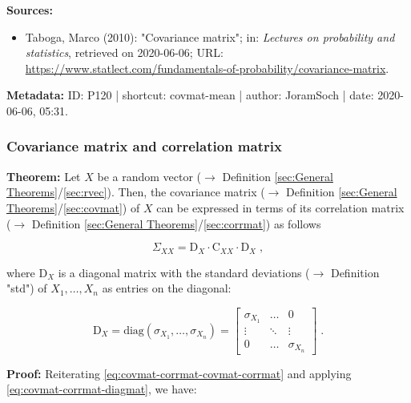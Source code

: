 \documentclass[a4paper,12pt,twoside]{book}
\begin{document}
\vspace{1em}
\textbf{Sources:}
\begin{itemize}
\item Taboga, Marco (2010): "Covariance matrix"; in: \textit{Lectures on probability and statistics}, retrieved on 2020-06-06; URL: \url{https://www.statlect.com/fundamentals-of-probability/covariance-matrix}.
\end{itemize}


\vspace{1em}
\textbf{Metadata:} ID: P120 | shortcut: covmat-mean | author: JoramSoch | date: 2020-06-06, 05:31.
\vspace{1em}



\subsubsection[\textbf{Covariance matrix and correlation matrix}]{Covariance matrix and correlation matrix} \label{sec:covmat-corrmat}
\setcounter{equation}{0}

\textbf{Theorem:} Let $X$ be a random vector ($\rightarrow$ Definition \ref{sec:General Theorems}/\ref{sec:rvec}). Then, the covariance matrix ($\rightarrow$ Definition \ref{sec:General Theorems}/\ref{sec:covmat}) of $X$ can be expressed in terms of its correlation matrix ($\rightarrow$ Definition \ref{sec:General Theorems}/\ref{sec:corrmat}) as follows

\begin{equation} \label{eq:covmat-corrmat-covmat-corrmat}
\Sigma_{XX} = \mathrm{D}_X \cdot \mathrm{C}_{XX} \cdot \mathrm{D}_X \; ,
\end{equation}

where $\mathrm{D}_X$ is a diagonal matrix with the standard deviations ($\rightarrow$ Definition "std") of $X_1, \ldots, X_n$ as entries on the diagonal:

\begin{equation} \label{eq:covmat-corrmat-diagmat}
\mathrm{D}_X = \mathrm{diag}(\sigma_{X_1},\ldots,\sigma_{X_n}) =
\begin{bmatrix}
\sigma_{X_1} & \ldots & 0 \\
\vdots & \ddots & \vdots \\
0 & \ldots & \sigma_{X_n}
\end{bmatrix} \; .
\end{equation}


\vspace{1em}
\textbf{Proof:} Reiterating \eqref{eq:covmat-corrmat-covmat-corrmat} and applying \eqref{eq:covmat-corrmat-diagmat}, we have:
\end{document}
